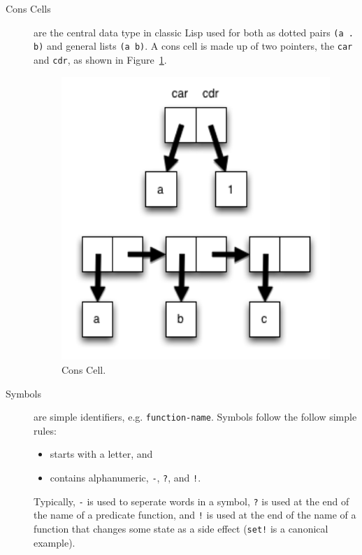 \documentclass[12pt]{article}
\begin{document}
\begin{description}

\item[Cons Cells] are the central data type in classic Lisp used for
  both as dotted pairs \verb|(a .  b)| and general lists \verb|(a b)|.
  A cons cell is made up of two pointers, the \verb|car| and
  \verb|cdr|, as shown in Figure~\ref{fig:conscell}.

\begin{figure}[htbp] %
   \centering
   \includegraphics[width=5in]{conscell.png} 
\caption{Cons Cell.}
\label{fig:conscell}
\end{figure}

\item[Symbols] are simple identifiers, e.g. \verb|function-name|.
Symbols follow the follow simple rules: 

\begin{itemize}
\item starts with a letter, and
\item contains alphanumeric, \verb|-|, \verb|?|, and \verb|!|.
\end{itemize}

Typically, \verb|-| is used to seperate words in a symbol, \verb|?| is
used at the end of the name of a predicate function, and \verb|!| is
used at the end of the name of a function that changes some state as a
side effect (\verb|set!| is a canonical example).


\end{description}
\end{document}
